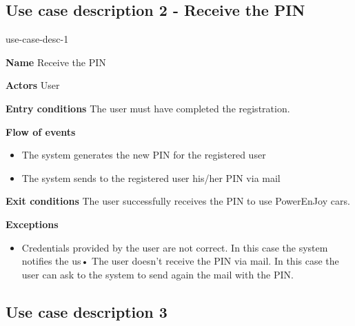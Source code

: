 \subsection{Use case description 2 - Receive the PIN}
\begin{labeling}{use-case-desc-1}
		\item[\textbf{Name}] Receive the PIN
		\item[\textbf{Actors}] User
		\item[\textbf{Entry conditions}] The user must have completed the registration.
		\item[\textbf{Flow of events}]
			\begin{itemize}
				\item[]
				\item The system generates the new PIN for the registered user
				\item The system sends to the registered user his/her PIN via mail
			\end{itemize}
		\item[\textbf{Exit conditions}] The user successfully receives the PIN to use PowerEnJoy cars.
		\item[\textbf{Exceptions}]
			\begin{itemize}
				\item[]
				\item Credentials provided by the user are not correct. In this case the system notifies the us•	The user doesn’t receive the PIN via mail. In this case the user can ask to the system to send again the mail with the PIN. 
			\end{itemize}
	\end{labeling}
	
\subsection{Use case description 3}